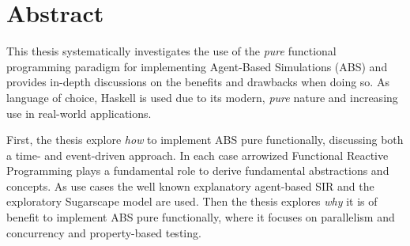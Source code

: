 \documentclass[oneside]{book}
\begin{document}
\cleardoublepage

\clearpage
\tableofcontents

\newpage

\thispagestyle{plain}

\section*{Abstract}
This thesis systematically investigates the use of the \textit{pure} functional programming paradigm for implementing Agent-Based Simulations (ABS) and provides in-depth discussions on the benefits and drawbacks when doing so. As language of choice, Haskell is used due to its modern, \textit{pure} nature and increasing use in real-world applications.

First, the thesis explore \textit{how} to implement ABS pure functionally, discussing both a time- and event-driven approach. In each case arrowized Functional Reactive Programming plays a fundamental role to derive fundamental abstractions and concepts. As use cases the well known explanatory agent-based SIR and the exploratory Sugarscape model are used. Then the thesis explores \textit{why} it is of benefit to implement ABS pure functionally, where it focuses on parallelism and concurrency and property-based testing. 

\clearpage
\end{document}
